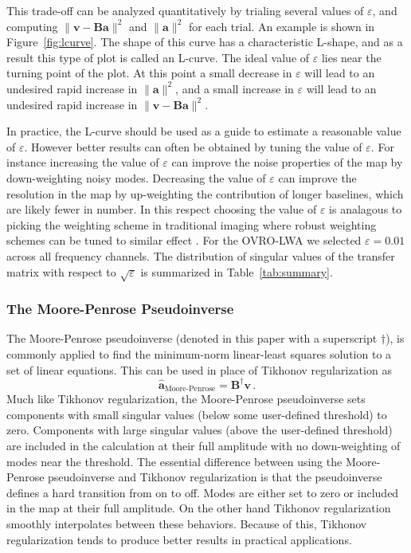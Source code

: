 \documentclass[twocolumn]{aastex61}
\renewcommand{\b}{\pmb}
\begin{document}
This trade-off can be analyzed quantitatively by trialing several values of $\varepsilon$, and
computing $\|\b v - \b B\b a\|^2$ and $\|\b a\|^2$ for each trial. An example is shown in
Figure~\ref{fig:lcurve}. The shape of this curve has a characteristic L-shape, and as a result this
type of plot is called an L-curve. The ideal value of $\varepsilon$ lies near the turning point of
the plot. At this point a small decrease in $\varepsilon$ will lead to an undesired rapid increase
in $\|\b a\|^2$, and a small increase in $\varepsilon$ will lead to an undesired rapid increase in
$\|\b v - \b B\b a\|^2$.

In practice, the L-curve should be used as a guide to estimate a reasonable value of $\varepsilon$.
However better results can often be obtained by tuning the value of $\varepsilon$. For instance
increasing the value of $\varepsilon$ can improve the noise properties of the map by down-weighting
noisy modes. Decreasing the value of $\varepsilon$ can improve the resolution in the map by
up-weighting the contribution of longer baselines, which are likely fewer in number. In this respect
choosing the value of $\varepsilon$ is analagous to picking the weighting scheme in traditional
imaging where robust weighting schemes can be tuned to similar effect \citep{briggs}.  For the
OVRO-LWA we selected $\varepsilon = 0.01$ across all frequency channels. The distribution of
singular values of the transfer matrix with respect to $\sqrt{\varepsilon}$ is summarized in
Table~\ref{tab:summary}.

\subsubsection{The Moore-Penrose Pseudoinverse}

The Moore-Penrose pseudoinverse (denoted in this paper with a superscript $\dagger$), is commonly
applied to find the minimum-norm linear-least squares solution to a set of linear equations. This
can be used in place of Tikhonov regularization as
\begin{equation}
    \b{\hat a}_\text{Moore-Penrose} = \b B^\dagger\b v\,.
\end{equation}
Much like Tikhonov regularization, the Moore-Penrose pseudoinverse sets components with small
singular values (below some user-defined threshold) to zero. Components with large singular values
(above the user-defined threshold) are included in the calculation at their full amplitude with no
down-weighting of modes near the threshold. The essential difference between using the Moore-Penrose
pseudoinverse and Tikhonov regularization is that the pseudoinverse defines a hard transition from
on to off. Modes are either set to zero or included in the map at their full amplitude. On the other
hand Tikhonov regularization smoothly interpolates between these behaviors. Because of this,
Tikhonov regularization tends to produce better results in practical applications.
\end{document}
